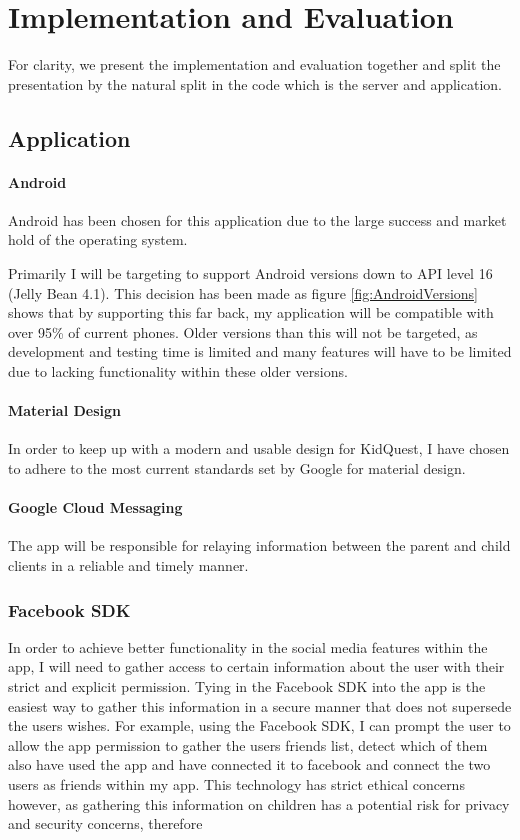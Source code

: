 
% 


\chapter{Implementation and Evaluation}

For clarity, we present the implementation and evaluation together and split the presentation by the natural split in the code which is the server and application.

\section{Application}
\subsubsection{Android}
Android has been chosen for this application due to the large success and market hold of the operating system.

Primarily I will be targeting to support Android versions down to API level 16 (Jelly Bean 4.1).
This decision has been made as figure \ref{fig:AndroidVersions} shows that by supporting this far back, my application will be compatible with over 95\% of current phones. 
Older versions than this will not be targeted, as development and testing time is limited and many features will have to be limited due to lacking functionality within these older versions.

\subsubsection{Material Design}
In order to keep up with a modern and usable design for KidQuest, I have chosen to adhere to the most current standards set by Google for material design.

\subsubsection{Google Cloud Messaging}
The app will be responsible for relaying information between the parent and child clients in a reliable and timely manner.

\subsection{Facebook SDK}
In order to achieve better functionality in the social media features within the app, I will need to gather access to certain information about the user with their strict and explicit permission. 
Tying in the Facebook SDK into the app is the easiest way to gather this information in a secure manner that does not supersede the users wishes.
For example, using the Facebook SDK, I can prompt the user to allow the app permission to gather the users friends list, detect which of them also have used the app and have connected it to facebook and connect the two users as friends within my app.
This technology has strict ethical concerns however, as gathering this information on children has a potential risk for privacy and security concerns, therefore

